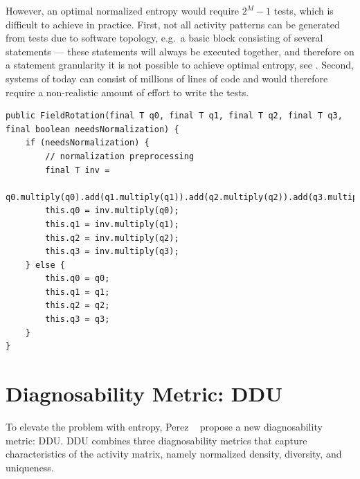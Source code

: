 \documentclass[twoside,a4paper,11pt]{memoir}
\begin{document}
However, an optimal normalized entropy would require \(2^M -1 \) tests, which is difficult to achieve in practice.
First, not all activity patterns can be generated from tests due to software topology, e.g.\ a basic block consisting of several statements --- these statements will always be executed together, and therefore on a statement granularity it is not possible to achieve optimal entropy, see .
Second, systems of today can consist of millions of lines of code and would therefore require a non-realistic amount of effort to write the tests.\\
\begin{minipage}{\linewidth}
\begin{lstlisting}[caption={Lines 4 - 9 will always be executed together and therefore no optimal entropy can be achieved on a statement granularity. Same holds for lines 11 - 14.},label={lst:topology}]
public FieldRotation(final T q0, final T q1, final T q2, final T q3, final boolean needsNormalization) {
    if (needsNormalization) {
        // normalization preprocessing
        final T inv =
                q0.multiply(q0).add(q1.multiply(q1)).add(q2.multiply(q2)).add(q3.multiply(q3)).sqrt().reciprocal();
        this.q0 = inv.multiply(q0);
        this.q1 = inv.multiply(q1);
        this.q2 = inv.multiply(q2);
        this.q3 = inv.multiply(q3);
    } else {
        this.q0 = q0;
        this.q1 = q1;
        this.q2 = q2;
        this.q3 = q3;
    }
}
\end{lstlisting}
\end{minipage}

\section{Diagnosability Metric: DDU}
To elevate the problem with entropy, Perez \etal~\cite{DBLP:conf/icse/PerezAD17} propose a new diagnosability metric: DDU\@.
DDU combines three diagnosability metrics that capture characteristics of the activity matrix, namely normalized density, diversity, and uniqueness.
\end{document}
